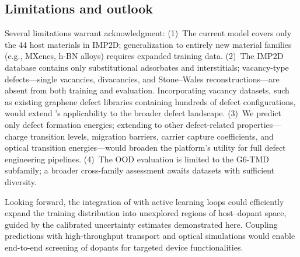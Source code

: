 \subsection{Limitations and outlook}

Several limitations warrant acknowledgment:
(1)~The current model covers only the 44 host materials in IMP2D;
generalization to entirely new material families (e.g., MXenes, h-BN
alloys) requires expanded training data.
(2)~The IMP2D database contains only substitutional adsorbates and
interstitials; vacancy-type defects---single vacancies, divacancies, and
Stone--Wales reconstructions---are absent from both training and
evaluation.
Incorporating vacancy datasets, such as existing graphene defect
libraries containing hundreds of defect configurations, would extend
\dart{}'s applicability to the broader defect landscape.
(3)~We predict only defect formation energies; extending to other
defect-related properties---charge transition levels, migration barriers,
carrier capture coefficients, and optical transition energies---would
broaden the platform's utility for full defect engineering pipelines.
(4)~The OOD evaluation is limited to the G6-TMD subfamily; a broader
cross-family assessment awaits datasets with sufficient diversity.

Looking forward, the integration of \dart{} with active learning loops
could efficiently expand the training distribution into unexplored
regions of host--dopant space, guided by the calibrated uncertainty
estimates demonstrated here.
Coupling \dart{} predictions with high-throughput transport and optical
simulations would enable end-to-end screening of dopants for targeted
device functionalities.
